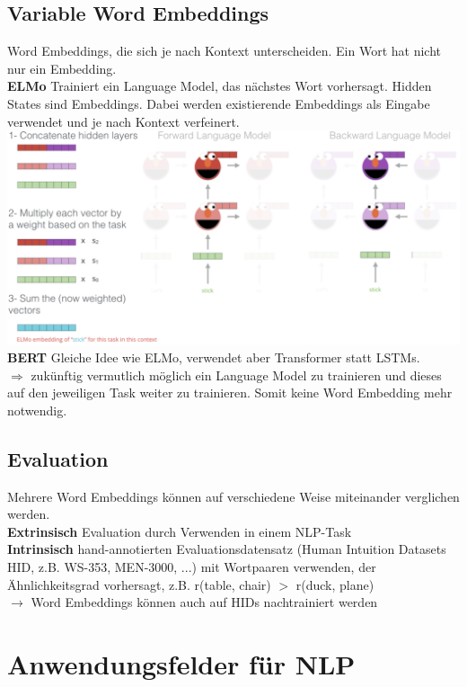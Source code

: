 \documentclass[12pt]{article}
\begin{document}
	\subsection{Variable Word Embeddings}
	Word Embeddings, die sich je nach Kontext unterscheiden. Ein Wort hat nicht nur ein Embedding.\\
	\textbf{ELMo} Trainiert ein Language Model, das nächstes Wort vorhersagt. Hidden States sind Embeddings. Dabei werden existierende Embeddings als Eingabe verwendet und je nach Kontext verfeinert.\\
	\includegraphics[width=\linewidth]{figures/elmo.png}\\
	\textbf{BERT} Gleiche Idee wie ELMo, verwendet aber Transformer statt LSTMs.\\
	$\Rightarrow$ zukünftig vermutlich möglich ein Language Model zu trainieren und dieses auf den jeweiligen Task weiter zu trainieren. Somit keine Word Embedding mehr notwendig.

	\subsection{Evaluation}
	Mehrere Word Embeddings können auf verschiedene Weise miteinander verglichen werden.\\
	\textbf{Extrinsisch} Evaluation durch Verwenden in einem NLP-Task\\
	\textbf{Intrinsisch} hand-annotierten Evaluationsdatensatz (Human Intuition Datasets HID, z.B. WS-353, MEN-3000, ...) mit Wortpaaren verwenden, der Ähnlichkeitsgrad vorhersagt, z.B. r(table, chair) $>$ r(duck, plane)\\
	$\rightarrow$ Word Embeddings können auch auf HIDs nachtrainiert werden

	\section{Anwendungsfelder für NLP}
\end{document}
